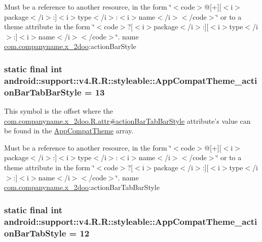 Must be a reference to another resource, in the form \char`\"{}$<$code$>$@\mbox{[}+\mbox{]}\mbox{[}$<$i$>$package$<$/i$>$:\mbox{]}$<$i$>$type$<$/i$>$:$<$i$>$name$<$/i$>$$<$/code$>$\char`\"{} or to a theme attribute in the form \char`\"{}$<$code$>$?\mbox{[}$<$i$>$package$<$/i$>$:\mbox{]}\mbox{[}$<$i$>$type$<$/i$>$:\mbox{]}$<$i$>$name$<$/i$>$$<$/code$>$\char`\"{}.  name \hyperlink{namespacecom_1_1companyname_1_1x__2doo}{com.companyname.x\_\-2doo}:actionBarStyle \hypertarget{classandroid_1_1support_1_1v4_1_1_r_1_1styleable_f88289a95a6edd4e037e864093455f6a}{
\subsubsection[{AppCompatTheme\_\-actionBarTabBarStyle}]{\setlength{\rightskip}{0pt plus 5cm}static final int android::support::v4.R.R::styleable::AppCompatTheme\_\-actionBarTabBarStyle = 13}}
\label{classandroid_1_1support_1_1v4_1_1_r_1_1styleable_f88289a95a6edd4e037e864093455f6a}


This symbol is the offset where the \hyperlink{classcom_1_1companyname_1_1x__2doo_1_1_r_1_1attr_c00dbca68f5e15ddc304e06a18c43a7d}{com.companyname.x\_\-2doo.R.attr\#actionBarTabBarStyle} attribute's value can be found in the \hyperlink{classandroid_1_1support_1_1v4_1_1_r_1_1styleable_0873e92ba21076bb5a4aeadeb7f5779f}{AppCompatTheme} array.

Must be a reference to another resource, in the form \char`\"{}$<$code$>$@\mbox{[}+\mbox{]}\mbox{[}$<$i$>$package$<$/i$>$:\mbox{]}$<$i$>$type$<$/i$>$:$<$i$>$name$<$/i$>$$<$/code$>$\char`\"{} or to a theme attribute in the form \char`\"{}$<$code$>$?\mbox{[}$<$i$>$package$<$/i$>$:\mbox{]}\mbox{[}$<$i$>$type$<$/i$>$:\mbox{]}$<$i$>$name$<$/i$>$$<$/code$>$\char`\"{}.  name \hyperlink{namespacecom_1_1companyname_1_1x__2doo}{com.companyname.x\_\-2doo}:actionBarTabBarStyle \hypertarget{classandroid_1_1support_1_1v4_1_1_r_1_1styleable_d41958baadf80c6e15b8c8c98ee941f2}{
\subsubsection[{AppCompatTheme\_\-actionBarTabStyle}]{\setlength{\rightskip}{0pt plus 5cm}static final int android::support::v4.R.R::styleable::AppCompatTheme\_\-actionBarTabStyle = 12}}
\label{classandroid_1_1support_1_1v4_1_1_r_1_1styleable_d41958baadf80c6e15b8c8c98ee941f2}


